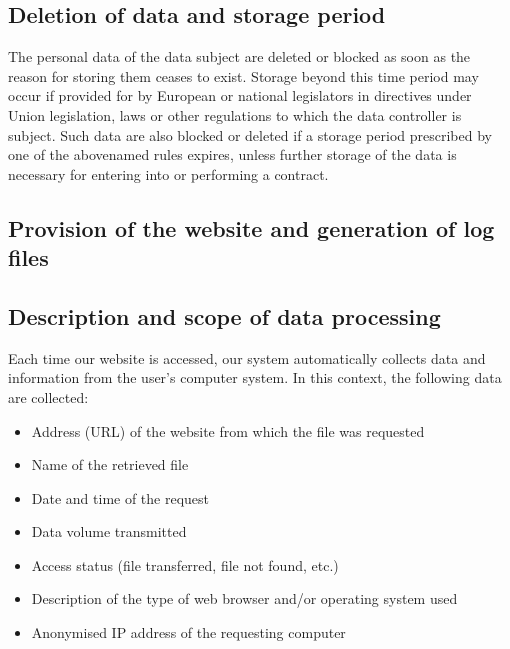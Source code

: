 \documentclass[letterpaper,10pt,english]{sphinxmanual}
\begin{document}
\subsection{Deletion of data and storage period}
\label{\detokenize{policies/privacy:deletion-of-data-and-storage-period}}
\sphinxAtStartPar
The personal data of the data subject are deleted or blocked as soon as the reason for storing them ceases to exist. Storage beyond this time period may occur if provided for by European or national legislators in directives under Union legislation, laws or other regulations to which the data controller is subject. Such data are also blocked or deleted if a storage period prescribed by one of the above\sphinxhyphen{}named rules expires, unless further storage of the data is necessary for entering into or performing a contract.


\subsection{Provision of the website and generation of log files}
\label{\detokenize{policies/privacy:provision-of-the-website-and-generation-of-log-files}}

\subsection{Description and scope of data processing}
\label{\detokenize{policies/privacy:description-and-scope-of-data-processing}}
\sphinxAtStartPar
Each time our website is accessed, our system automatically collects data and information from the user’s computer system.
In this context, the following data are collected:
\begin{itemize}
\item {} 
\sphinxAtStartPar
Address (URL) of the website from which the file was requested

\item {} 
\sphinxAtStartPar
Name of the retrieved file

\item {} 
\sphinxAtStartPar
Date and time of the request

\item {} 
\sphinxAtStartPar
Data volume transmitted

\item {} 
\sphinxAtStartPar
Access status (file transferred, file not found, etc.)

\item {} 
\sphinxAtStartPar
Description of the type of web browser and/or operating system used

\item {} 
\sphinxAtStartPar
Anonymised IP address of the requesting computer

\end{itemize}
\end{document}
